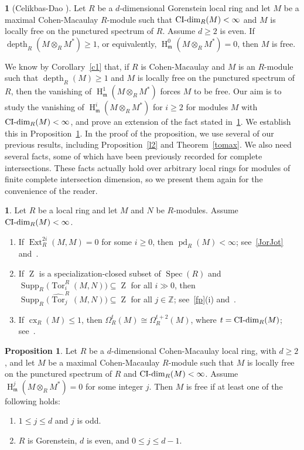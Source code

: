 \documentclass[11pt]{amsart}
\theoremstyle{definition}
\newtheorem{prop}[thm]{Proposition}
\theoremstyle{definition}
\newtheorem{chunk}[thm]{\hspace*{-1.065ex}\bf}
\numberwithin{equation}{section}
\newcommand{\fm}{\mathfrak{m}}
\newcommand{\ZZ}{\mathbb{Z}}
\DeclareMathOperator{\CI}{\textnormal{CI-dim}}
\DeclareMathOperator{\cx}{cx}
\DeclareMathOperator{\mz}{Z}
\DeclareMathOperator{\depth}{depth}
\DeclareMathOperator{\Ext}{Ext}
\DeclareMathOperator{\hh}{H}
\DeclareMathOperator{\pd}{pd}
\DeclareMathOperator{\Supp}{Supp}
\DeclareMathOperator{\Spec}{Spec}
\DeclareMathOperator{\Tor}{Tor}
\begin{document}
\begin{chunk} [{Celikbas-Dao \cite[3.9]{CeD}}] \label{CelDa} Let $R$ be a $d$-dimensional Gorenstein local ring and let $M$ be a maximal Cohen-Macaulay $R$-module such that $\CI_R(M)<\infty$ and $M$ is locally free on the punctured spectrum of $R$. Assume $d\geq 2$ is even. If $\depth_R(M\otimes_RM^{\ast})\geq 1$, or equivalently, $\hh^0_{\fm}(M\otimes_RM^{\ast})=0$, then $M$ is free.
\end{chunk}

We know by Corollary~\ref{c1} that, if $R$ is Cohen-Macaulay and $M$ is an $R$-module such that $\depth_R(M)\geq 1$ and $M$ is locally free on the punctured spectrum of $R$, then the vanishing of $\hh^1_{\fm}(M\otimes_RM^{\ast})$ forces $M$ to be free. Our aim is to study the vanishing of $\hh^i_{\fm}(M\otimes_RM^{\ast})$ for $i\geq 2$ for modules $M$ with $\CI_R(M)<\infty$, and prove an extension of the fact stated in~\ref{CelDa}. We establish this in Proposition~\ref{gor}. In the proof of the proposition, we use several of our previous results, including Proposition~\ref{l2} and Theorem~\ref{tomax}. We also need several facts, some of which have been previously recorded for complete intersections. These facts actually hold over arbitrary local rings for modules of finite complete intersection dimension, so we present them again for the convenience of the reader.

\begin{chunk} \label{CIfacts} Let $R$ be a local ring and let $M$ and $N$ be $R$-modules. Assume $\CI_R(M)<\infty$.
\begin{enumerate}[\rm(i)]
\item If $\Ext^{2i}_R(M,M)=0$ for some $i\geq 0$, then $\pd_R(M)<\infty$; see~\ref{JorJot} and~\cite[4.2]{AvBu}. 
\item If $\mz$ is a specialization-closed subset of $\Spec(R)$ and $\Supp_R\big(\Tor_{i}^R(M,N)\big)\subseteq\mz$ for all $i\gg 0$, then $ \Supp_R\Big(\widehat{\Tor}_j^R(M,N)\Big) \subseteq\mz$ for all $j\in\ZZ$; see~\ref{fp}(i) and~\cite[4.9]{AvBu}.
\item If $\cx_R(M)\leq 1$, then $\Omega_R^t(M) \cong \Omega_R^{t+2}(M)$, where $t= \CI_R(M)$; see~\cite[7.3]{AGP}.
\end{enumerate}
\end{chunk}

\begin{prop}\label{gor} Let $R$ be a $d$-dimensional Cohen-Macaulay local ring, with $d\geq 2$, and let $M$ be a maximal Cohen-Macaulay $R$-module such that $M$ is locally free on the punctured spectrum of $R$ and $\CI_R(M)<\infty$. Assume $\hh^j_{\fm}(M\otimes_RM^{\ast})=0$ for some integer $j$.
Then $M$ is free if at least one of the following holds:
\begin{enumerate}[\rm(i)]
\item $1\leq j\leq d$ and $j$ is odd.
\item $R$ is Gorenstein, $d$ is even, and $0\leq j\leq d-1$.
\end{enumerate}
\end{prop}
\end{document}
